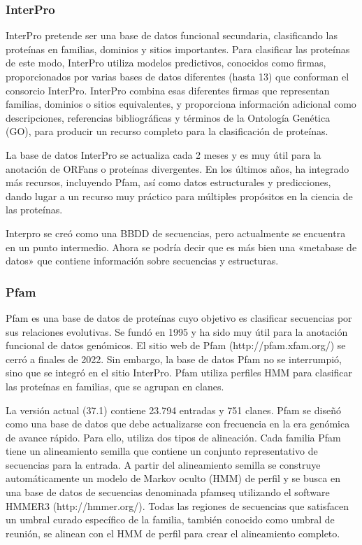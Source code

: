 \subsubsection{InterPro}
InterPro pretende ser una base de datos funcional secundaria, clasificando las proteínas en familias, dominios y sitios importantes. Para clasificar las proteínas de este modo, InterPro utiliza modelos predictivos, conocidos como firmas, proporcionados por varias bases de datos diferentes (hasta 13) que conforman el consorcio InterPro. InterPro combina esas diferentes firmas que representan familias, dominios o sitios equivalentes, y proporciona información adicional como descripciones, referencias bibliográficas y términos de la Ontología Genética (GO), para producir un recurso completo para la clasificación de proteínas.

La base de datos InterPro se actualiza cada 2 meses y es muy útil para la anotación de ORFans o proteínas divergentes. En los últimos años, ha integrado más recursos, incluyendo Pfam, así como datos estructurales y predicciones, dando lugar a un recurso muy práctico para múltiples propósitos en la ciencia de las proteínas.

Interpro se creó como una BBDD de secuencias, pero actualmente se encuentra en un punto intermedio. Ahora se podría decir que es más bien una «metabase de datos» que contiene información sobre secuencias y estructuras.

\subsubsection{Pfam}
Pfam es una base de datos de proteínas cuyo objetivo es clasificar secuencias por sus relaciones evolutivas. Se fundó en 1995 y ha sido muy útil para la anotación funcional de datos genómicos. El sitio web de Pfam (http://pfam.xfam.org/) se cerró a finales de 2022. Sin embargo, la base de datos Pfam no se interrumpió, sino que se integró en el sitio InterPro. Pfam utiliza perfiles HMM para clasificar las proteínas en familias, que se agrupan en clanes. 

La versión actual (37.1) contiene 23.794 entradas y 751 clanes. Pfam se diseñó como una base de datos que debe actualizarse con frecuencia en la era genómica de avance rápido. Para ello, utiliza dos tipos de alineación. Cada familia Pfam tiene un alineamiento semilla que contiene un conjunto representativo de secuencias para la entrada. A partir del alineamiento semilla se construye automáticamente un modelo de Markov oculto (HMM) de perfil y se busca en una base de datos de secuencias denominada pfamseq utilizando el software HMMER3 (http://hmmer.org/). Todas las regiones de secuencias que satisfacen un umbral curado específico de la familia, también conocido como umbral de reunión, se alinean con el HMM de perfil para crear el alineamiento completo.

